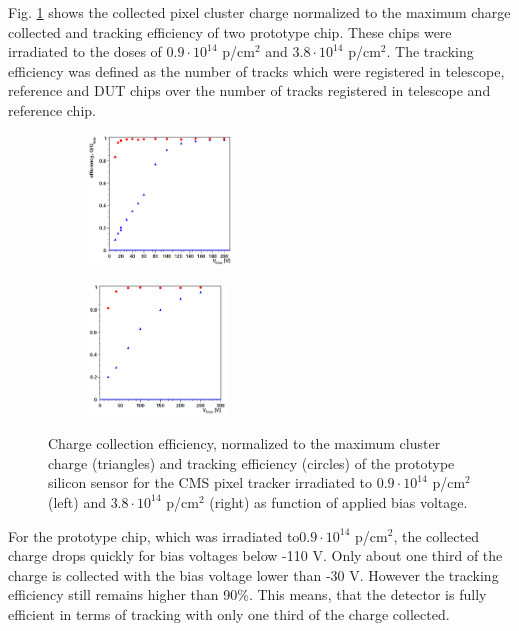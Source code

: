 Fig. \ref{fig:depletion_voltage} shows the collected pixel cluster charge normalized to the maximum charge collected and tracking efficiency
of two prototype chip. These chips were irradiated to the doses of $0.9 \cdot 10^{14}$ p/cm$^2$ and $3.8 \cdot 10^{14}$ p/cm$^2$. 
The tracking efficiency was defined as the number of tracks which were registered in telescope, reference and DUT chips over the number
of tracks registered in telescope and reference chip.

\begin{figure}[t]
\centering
\begin{subfigure}
  \centering
  \includegraphics[width=0.42\textwidth]{021_pixel_upgrade/plots/voltage_scan_low_irrad.png}
\end{subfigure}
\begin{subfigure}
  \centering
  \includegraphics[width=0.4\textwidth]{021_pixel_upgrade/plots/voltage_scan_high_irrad.png}
\end{subfigure}
\caption{Charge collection efficiency, normalized to the maximum cluster charge (triangles) and tracking efficiency (circles) of the prototype silicon sensor
         for the CMS pixel tracker irradiated to $0.9 \cdot 10^{14}$ p/cm$^2$ (left) and $3.8 \cdot 10^{14}$ p/cm$^2$ (right) as function of applied bias voltage.}
\label{fig:depletion_voltage}
\end{figure}

For the prototype chip, which was irradiated to$0.9 \cdot 10^{14}$ p/cm$^2$, the collected charge drops quickly for bias voltages below -110 V. 
Only about one third of the charge is collected with the bias voltage lower than -30 V. However the tracking efficiency still remains higher
than 90\%. This means, that the detector is fully efficient in terms of tracking with only one third of the charge collected.

